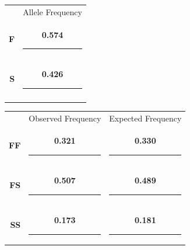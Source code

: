 \begin{minipage}{0.3\linewidth}
	\begin{tabular}{rc}
	&	Allele Frequency\\[3ex]
	\Large\textbf{F} & \ifprintanswers\textbf{0.574} \else \rule{3cm}{0.4pt} \fi\\[3ex]
	\Large\textbf{S} & \ifprintanswers\textbf{0.426} \else \rule{3cm}{0.4pt} \fi\\[3ex]
	\Large\null	 & \null\\
	\end{tabular}
\end{minipage}\hfill
\begin{minipage}{0.6\linewidth}
	\begin{tabular}{rcc}
		&	Observed Frequency		&	Expected Frequency\\[3ex]
		\large\textbf{FF} & \ifprintanswers\textbf{0.321} \else \rule{3cm}{0.4pt} \fi & \ifprintanswers\textbf{0.330} \else \rule{3cm}{0.4pt} \fi\\[3ex]
		\large\textbf{FS} & \ifprintanswers\textbf{0.507} \else \rule{3cm}{0.4pt} \fi & \ifprintanswers\textbf{0.489} \else \rule{3cm}{0.4pt} \fi \\[3ex]
		\large\textbf{SS} & \ifprintanswers\textbf{0.173} \else \rule{3cm}{0.4pt} \fi & \ifprintanswers\textbf{0.181} \else \rule{3cm}{0.4pt} \fi \\
	\end{tabular}
\end{minipage}
